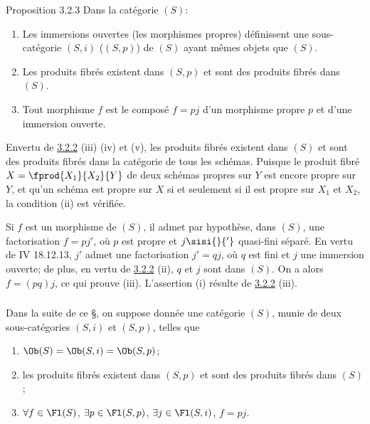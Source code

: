 \documentclass[10pt]{../fichiers-configuration-latex/smfart}
\begin{document}
\begin{enonce*}{Proposition 3.2.3}
Dans la catégorie $(S)$:
\begin{enumerate}
\renewcommand{\theenumi}{\roman{enumi}}
\renewcommand{\labelenumi}{(\theenumi)}
\item Les immersions ouvertes (\resp les morphismes propres)
définissent une sous-catégorie $(S,i)$ (\resp $(S,p)$) de $(S)$ ayant
mêmes objets que $(S)$.

\item Les produits fibrés existent dans $(S,p)$ et sont des produits
fibrés dans $(S)$.

\item Tout morphisme $f$ est le composé $f=pj$ d'un morphisme propre
$p$ et d'une immersion ouverte.
\end{enumerate}
\end{enonce*}

En\pageoriginale vertu de \hyperref[XVII.prop3.2.2]{3.2.2} (iii) (iv) et (v), les produits fibrés
existent dans $(S)$ et sont des produits fibrés dans la catégorie de
tous les schémas. Puisque le produit fibré $X=\fprod{X_1}{X_2}{Y}$ de
deux schémas propres sur $Y$ est encore propre sur $Y$, et qu'un
schéma est propre sur $X$ si et seulement si il est propre sur $X_1$
et $X_2$, la condition (ii) est vérifiée.

Si $f$ est un morphisme de $(S)$, il admet par hypothèse, dans $(S)$,
une factorisation $f=pj'$, où $p$ est propre et $j\sisi{}{'}$ quasi-fini
séparé. En vertu de \EGA IV 18.12.13, $j'$ admet une factorisation
$j'=qj$, où $q$ est fini et $j$ une immersion ouverte; de plus, en
vertu de \hyperref[XVII.prop3.2.2]{3.2.2} (ii), $q$ et $j$ sont dans $(S)$. On a alors $f=(pq)j$,
ce qui prouve (iii). L'assertion (i) résulte de \hyperref[XVII.prop3.2.2]{3.2.2} (iii).

\setcounter{subsubsection}{3}
\subsubsection{}
Dans la suite de ce \S, on suppose donnée une catégorie $(S)$, munie
de deux sous-catégories $(S,i)$ et $(S,p)$, telles que
\begin{enumerate}
\renewcommand{\theenumi}{\roman{enumi}}
\renewcommand{\labelenumi}{(\theenumi)}
\item $\Ob(S)=\Ob(S,i)=\Ob(S,p)$;

\item les produits fibrés existent dans $(S,p)$ et sont des produits
fibrés dans $(S)$;

\item $\forall f\in \Fl(S)$, $\exists p\in \Fl(S,p)$, $\exists
j\in \Fl(S,i)$, $f=pj$.
\end{enumerate}
\end{document}
